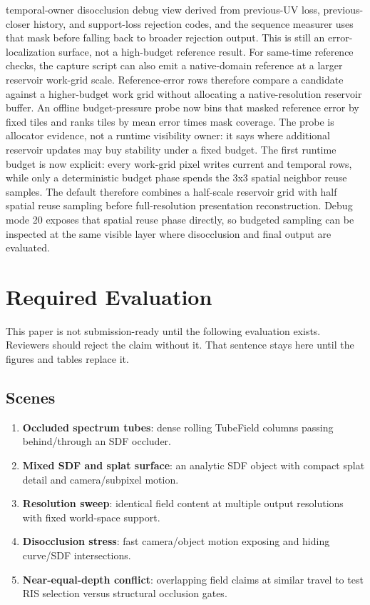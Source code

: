 \documentclass[11pt]{article}
\begin{document}
temporal-owner disocclusion debug view derived from previous-UV loss,
previous-closer history, and support-loss rejection codes, and the sequence
measurer uses that mask before falling back to broader rejection output.  This
is still an error-localization surface, not a high-budget reference result.
For same-time reference checks, the capture script can also emit a native-domain
reference at a larger reservoir work-grid scale.  Reference-error rows therefore
compare a candidate against a higher-budget work grid without allocating a
native-resolution reservoir buffer.
An offline budget-pressure probe now bins that masked reference error by fixed
tiles and ranks tiles by mean error times mask coverage.  The probe is allocator
evidence, not a runtime visibility owner: it says where additional reservoir
updates may buy stability under a fixed budget.
The first runtime budget is now explicit: every work-grid pixel writes current
and temporal rows, while only a deterministic budget phase spends the 3x3
spatial neighbor reuse samples.  The default therefore combines a half-scale
reservoir grid with half spatial reuse sampling before full-resolution
presentation reconstruction.
Debug mode 20 exposes that spatial reuse phase directly, so budgeted sampling
can be inspected at the same visible layer where disocclusion and final output
are evaluated.

\section{Required Evaluation}

This paper is not submission-ready until the following evaluation exists.
Reviewers should reject the claim without it.  That sentence stays here until
the figures and tables replace it.

\subsection{Scenes}

\begin{enumerate}[leftmargin=1.5em]
  \item \textbf{Occluded spectrum tubes}: dense rolling TubeField columns
  passing behind/through an SDF occluder.
  \item \textbf{Mixed SDF and splat surface}: an analytic SDF object with
  compact splat detail and camera/subpixel motion.
  \item \textbf{Resolution sweep}: identical field content at multiple output
  resolutions with fixed world-space support.
  \item \textbf{Disocclusion stress}: fast camera/object motion exposing and
  hiding curve/SDF intersections.
  \item \textbf{Near-equal-depth conflict}: overlapping field claims at similar
  travel to test RIS selection versus structural occlusion gates.
\end{enumerate}
\end{document}
